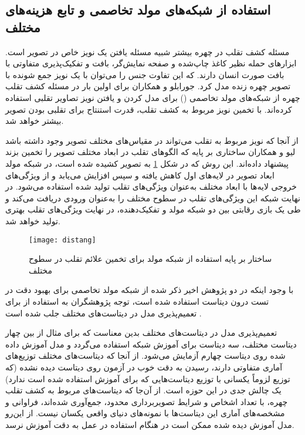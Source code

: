 \subsection{استفاده از شبکه‌های مولد تخاصمی و تابع هزینه‌های مختلف}
مسئله کشف تقلب در چهره بیشتر شبیه مسئله یافتن یک نویز خاص در تصویر است. ابزارهای حمله نظیر کاغذ چاپ‌شده و صفحه نمایش‌گر، بافت و تفکیک‌پذیری متفاوتی با بافت صورت انسان دارند. که این تفاوت جنس را می‌توان با یک نویز جمع شونده با تصویر چهره زنده مدل کرد. جورابلو و همکاران
\cite{jourabloo2018face}
برای اولین بار در مسئله کشف تقلب چهره از شبکه‌های مولد تخاصمی
 ()
\cite{goodfellow2014generative}
برای مدل کردن و یافتن نویز تصاویر تقلبی استفاده کرده‌اند. با تخمین نویز مربوط به کشف تقلب، قدرت استنتاج برای تقلبی بودن تصویر بیشتر خواهد شد.

از آنجا که نویز مربوط به تقلب می‌تواند در مقیاس‌های مختلف تصویر وجود داشته باشد لیو و همکاران
\cite{liu2020disentangling}
ساختاری بر پایه  که الگوهای تقلب در ابعاد مختلف تصویر را تخمین بزند پیشنهاد داده‌اند. این روش که در شکل 
\ref{fig:distang}
به تصویر کشیده شده است، در شبکه مولد
ابعاد تصویر در لایه‌های اول کاهش یافته و سپس افزایش می‌یابد و از ویژگی‌های خروجی لایه‌ها با ابعاد مختلف به‌عنوان ویژگی‌های تقلب تولید شده استفاده می‌شود. در نهایت شبکه  
این ویژگی‌های تقلب در سطوح مختلف را به‌عنوان ورودی دریافت می‌کند و طی یک بازی رقابتی بین دو شبکه مولد و تفکیک‌دهنده، در نهایت ویژگی‌های تقلب بهتری تولید خواهد شد. 
\begin{figure}[h]
	\centerline{\texttt{[image: distang]}}
	\caption{ساختار بر پایه استفاده از شبکه مولد برای تخمین علائم تقلب در سطوح مختلف \cite{liu2020disentangling} }
	\label{fig:distang}
\end{figure}

با وجود اینکه در دو پژوهش اخیر ذکر شده
\cite{jourabloo2018face,liu2020disentangling}
از شبکه مولد تخاصمی برای بهبود دقت در تست درون دیتاست استفاده شده است، توجه پژوهشگران به استفاده از  برای تعمیم‌پذیری مدل در دیتاست‌های مختلف جلب شده است
\cite{shao2019multi,jia2020single}.

تعمیم‌پذیری مدل در دیتاست‌های مختلف بدین معناست که برای مثال از بین چهار دیتاست مختلف، سه دیتاست برای آموزش شبکه استفاده می‌گردد و مدل آموزش داده شده روی دیتاست چهارم آزمایش می‌شود. از آنجا که دیتاست‌های مختلف توزیع‌های آماری متفاوتی دارند، رسیدن به دقت خوب در آزمون روی دیتاست دیده نشده (که توزیع لزوماً یکسانی با توزیع دیتاست‌هایی که برای آموزش استفاده شده است ندارد) یک چالش جدی در این حوزه است. از آن‌جا که دیتاست‌های مربوط به کشف تقلب چهره، با تعداد اشخاص و شرایط تصویر‌برداری محدود، جمع‌آوری شده‌اند، فراوانی و مشخصه‌های آماری این دیتاست‌ها با نمونه‌های دنیای واقعی یکسان نیست. از این‌رو مدل آموزش دیده شده ممکن است در هنگام استفاده در عمل به دقت آموزش نرسد. 

